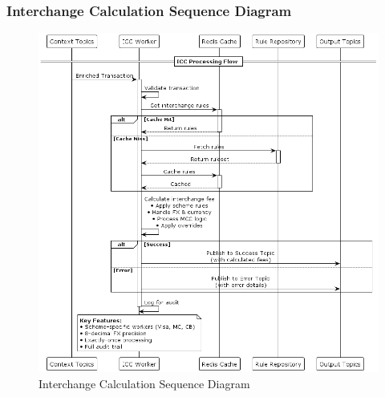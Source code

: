 \subsubsection{Interchange Calculation Sequence Diagram}
\begin{figure}[H]
    \centering
    \includegraphics[width=1.05\textwidth]{out/diagrams/plantuml/in/ic-sequence/P2S Interchange Fee Calculation Process.png}
    \caption{Interchange Calculation Sequence Diagram}
    \label{fig:interchange_calculation_sequence}
\end{figure}


